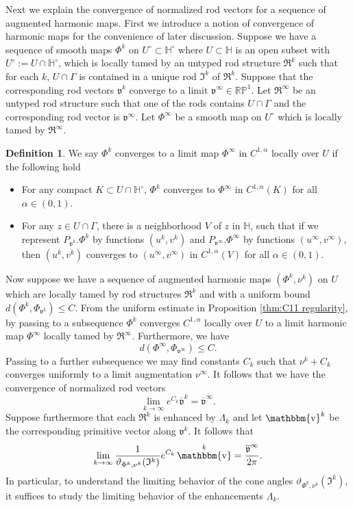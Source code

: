 \documentclass[a4paper,11pt]{amsart}
\theoremstyle{definition}
\newtheorem{definition}[theorem]{Definition}
\numberwithin{equation}{section}
\newcommand{\dH}{\mathbb{H}}
\newcommand{\R}{\mathbb{R}}
\newcommand{\dP}{\mathbb{P}}
\newcommand{\mv} {\mathfrak v}
\newcommand{\mI} {\mathfrak I}
\newcommand{\mR} {\mathfrak R}
\DeclareMathOperator{\bbv}{\mathbbm{v}}
\begin{document}
Next we explain the convergence of normalized rod vectors for a sequence of augmented harmonic maps. First we introduce a notion of convergence of harmonic maps for the convenience of later discussion. Suppose we have a sequence of smooth maps $\Phi^k$ on $U^\circ\subset \dH^\circ$ where $U\subset\mathbb H$ is an open subset with $U^\circ:=U\cap\mathbb{H}^\circ$, which is locally tamed by an untyped rod structure $\mR^k$ such that for each $k$, $U\cap \Gamma$ is contained in a unique rod $\mI^k$ of $\mR^k$. Suppose that the corresponding rod vectors $\mv^k$ converge to a limit $\mv^\infty\in \R\dP^1$. Let $\mR^\infty$ be an untyped rod structure such that one of the rods contains $U\cap \Gamma$ and the corresponding rod vector is $\mv^\infty$. Let $\Phi^\infty$ be a smooth map on $U^\circ$ which is locally tamed by $\mR^\infty$.
\begin{definition}\label{defi: local uniform convergence}
    We say $\Phi^k$ converges to a limit map $\Phi^\infty$ in $C^{1, \alpha}$ locally over $U$ if the following hold
    \begin{itemize}
        \item For any compact $K\subset U\cap \dH^\circ$, $\Phi^k$ converges to $\Phi^\infty$ in $C^{1, \alpha}(K)$ for all $\alpha\in (0, 1)$.
        \item For any $z\in U\cap \Gamma$, there is a neighborhood $V$ of $z$ in $\dH$, such that if we represent $P_{\mv^k}.\Phi^k$ by functions $(u^k, v^k)$ and $P_{\mv^\infty}. \Phi^\infty$ by functions $(u^\infty, v^\infty)$, then $(u^k, v^k)$ converges to $(u^\infty, v^\infty)$ in $C^{1, \alpha}(V)$ for all $\alpha\in (0, 1)$.
    \end{itemize}
\end{definition}

Now suppose we have a sequence of augmented harmonic maps $(\Phi^k, \nu^k)$ on $U$ which are locally tamed by  rod structures $\mR^k$ and with a uniform bound $d(\Phi^k,\Phi_{\mv^k})\leq C$. From the uniform estimate in Proposition \ref{thm:C11 regularity}, by passing to a subsequence $\Phi^k$ converges $C^{1, \alpha}$ locally over $U$ to a limit harmonic map $\Phi^\infty$ locally tamed by $\mR^\infty$. Furthermore, we have 
$$d(\Phi^\infty, \Phi_{\mv^\infty})\leq C.$$Passing to a further subsequence we may find constants $C_k$ such that $\nu^k+C_k$ converges uniformly to a limit augmentation $\nu^\infty$. It follows that we have the convergence of normalized rod vectors
\begin{equation}\label{e:angle convergence}\lim_{k\rightarrow\infty}e^{C_k}\overline{\mv}^k=\overline{\mv}^\infty.
\end{equation}
Suppose furthermore that each $\mR^k$ is enhanced by $\Lambda_k$ and let $\bbv^k$ be the corresponding primitive vector along $\mv^k$. It follows that 
\begin{equation}
     \lim_{k\to\infty}\frac{1}{\vartheta_{\Phi^k, \nu^k}(\mI^k)}e^{C_k}\bbv^k=\frac{\overline{\mathfrak{v}}^\infty}{2\pi}.
\end{equation}
In particular, to understand the limiting behavior of the cone angles $\vartheta_{\Phi^k, \nu^k}(\mI^k)$, it suffices to study the limiting behavior of the enhancements $\Lambda_k$. 
\end{document}
